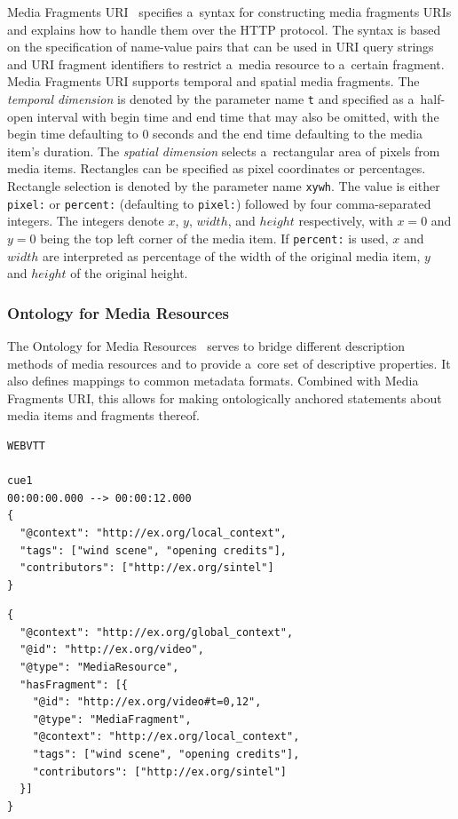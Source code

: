 \documentclass[runningheads,a4paper]{llncs}
\newcommand{\inlinelistingsize}{\fontsize{8pt}{11pt}}
\let\oldurl\url
\renewcommand{\url}[1]{\inlinelistingsize\oldurl{#1}}
\def\JSONLD{\mbox{JSON-LD}}
\def\JSONLD{\mbox{JSON-LD}}
\begin{document}
Media Fragments URI~\cite{troncy2012mediafragments}
specifies a~syntax for constructing media fragments URIs
and explains how to handle them over the HTTP protocol.
The syntax is based on the specification of
name-value pairs that can be used in URI query strings
and URI fragment identifiers to restrict a~media resource
to a~certain fragment.
Media Fragments URI supports temporal and spatial media fragments.
The \emph{temporal dimension} is denoted
by the parameter name \texttt{t} and specified
as a~half-open interval with begin time and end time
that may also be omitted,
with the begin time defaulting to 0 seconds
and the end time defaulting to the media item's duration.
The \emph{spatial dimension} selects
a~rectangular area of pixels from media items.
Rectangles can be specified as pixel coordinates or percentages.
Rectangle selection is denoted by the parameter name \texttt{xywh}.
The value is either \texttt{pixel:} or \texttt{percent:}
(defaulting to \texttt{pixel:})
followed by four comma-separated integers.
The integers denote $x$, $y$, $width$, and $height$ respectively,
with $x = 0$ and $y = 0$ being the top left corner of the media item.
If \texttt{percent:} is used, $x$ and $width$ are interpreted
as percentage of the width of the original media item,
$y$ and $height$
of the original height.

\subsubsection{Ontology for Media Resources}

The Ontology for Media Resources~\cite{lee2012mediaontology}
serves to bridge different description methods of media resources
and to provide a~core set of descriptive properties.
It also defines mappings to common metadata formats.
Combined with Media Fragments URI,
this allows for making ontologically anchored statements
about media items and fragments thereof.

\begin{lstlisting}[caption={Sample WebVTT metadata file},
  label=listing:webvtt, float=t!]
WEBVTT

cue1
00:00:00.000 --> 00:00:12.000
{
  "@context": "http://ex.org/local_context",
  "tags": ["wind scene", "opening credits"],
  "contributors": ["http://ex.org/sintel"]
}
\end{lstlisting}

\begin{lstlisting}[caption={Generated \JSONLD~for the Web of Data, see
    \url{http://bit.ly/webvtt-jsonld} for the RDF triples},
  label=listing:jsonld, float=t!]
{
  "@context": "http://ex.org/global_context",
  "@id": "http://ex.org/video",
  "@type": "MediaResource",
  "hasFragment": [{
    "@id": "http://ex.org/video#t=0,12",
    "@type": "MediaFragment",
    "@context": "http://ex.org/local_context",
    "tags": ["wind scene", "opening credits"],
    "contributors": ["http://ex.org/sintel"]
  }]
}
\end{lstlisting}
\end{document}
